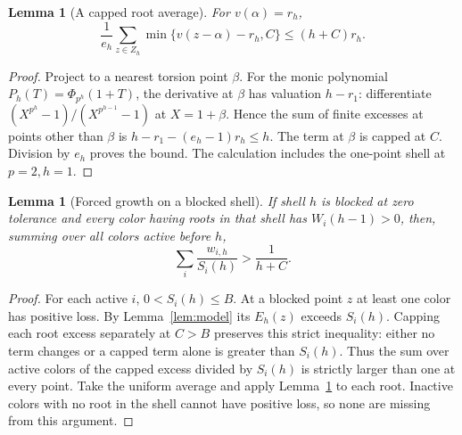\documentclass[11pt]{article}
\newtheorem{lemma}[theorem]{Lemma}
\theoremstyle{remark}\newtheorem{remark}[theorem]{Remark}
\begin{document}
\begin{lemma}[A capped root average]\label{lem:cap}
For $v(\alpha)=r_h$,
\[
 \frac1{e_h}\sum_{z\in Z_h}\min\{v(z-\alpha)-r_h,C\}\le (h+C)r_h.
\]
\end{lemma}
\begin{proof}
Project to a nearest torsion point $\beta$. For the monic polynomial $P_h(T)=\Phi_{p^h}(1+T)$, the derivative at $\beta$ has valuation $h-r_1$: differentiate $(X^{p^h}-1)/(X^{p^{h-1}}-1)$ at $X=1+\beta$. Hence the sum of finite excesses at points other than $\beta$ is $h-r_1-(e_h-1)r_h\le h$. The term at $\beta$ is capped at $C$. Division by $e_h$ proves the bound. The calculation includes the one-point shell at $p=2,h=1$.
\end{proof}

\begin{lemma}[Forced growth on a blocked shell]\label{lem:forced}
If shell $h$ is blocked at zero tolerance and every color having roots in that shell has $W_i(h-1)>0$, then, summing over all colors active before $h$,
\begin{equation}\label{eq:forced}
 \sum_i\frac{w_{i,h}}{S_i(h)}>\frac1{h+C}.
\end{equation}
\end{lemma}
\begin{proof}
For each active $i$, $0<S_i(h)\le B$. At a blocked point $z$ at least one color has positive loss. By Lemma~\ref{lem:model} its $E_h(z)$ exceeds $S_i(h)$. Capping each root excess separately at $C>B$ preserves this strict inequality: either no term changes or a capped term alone is greater than $S_i(h)$. Thus the sum over active colors of the capped excess divided by $S_i(h)$ is strictly larger than one at every point. Take the uniform average and apply Lemma~\ref{lem:cap} to each root. Inactive colors with no root in the shell cannot have positive loss, so none are missing from this argument.
\end{proof}
\end{document}
